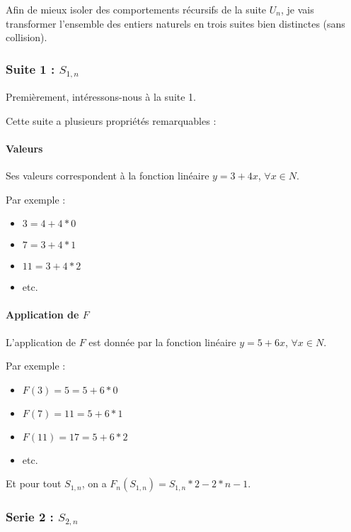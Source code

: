 \documentclass{book}
\begin{document}
Afin de mieux isoler des comportements r\'ecursifs de la suite $U_n$, je vais transformer l'ensemble des entiers naturels en trois suites bien distinctes (sans collision).

\subsubsection{Suite 1 : $S_{1,n}$}

Premi\`erement, int\'eressons-nous \`a la suite 1.

Cette suite a plusieurs propri\'et\'es remarquables :

\paragraph{Valeurs}

Ses valeurs correspondent \`a la fonction lin\'eaire $y = 3 + 4x$, $\forall x \in N$.

Par exemple :

\begin{itemize}
	\item $3 = 4 + 4 * 0$
	\item $7 = 3 + 4 * 1$
	\item $11 = 3 + 4 * 2$
	\item etc.
\end{itemize}

\paragraph{Application de $F$}

L'application de $F$ est donn\'ee par la fonction lin\'eaire $y = 5 + 6x$, $\forall x \in N$.

Par exemple :

\begin{itemize}
	\item $F(3) = 5 = 5 + 6 * 0$
	\item $F(7) = 11 = 5 + 6 * 1$
	\item $F(11) = 17 = 5 + 6 * 2$
	\item etc.
\end{itemize}

Et pour tout $S_{1,n}$, on a $F_n(S_{1,n}) = S_{1,n} * 2 - 2 * n - 1$.

\subsubsection{Serie 2 : $S_{2,n}$}
\end{document}
